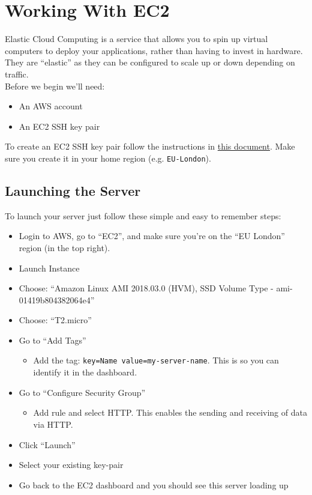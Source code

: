 \section{Working With EC2}

Elastic Cloud Computing is a service that allows you to spin up virtual computers to deploy your applications, rather than having to invest in hardware. They are ``elastic'' as they can be configured to scale up or down depending on traffic.
\\

Before we begin we'll need:

\begin{itemize}
    \item An AWS account
    \item An EC2 SSH key pair
\end{itemize}

To create an EC2 SSH key pair follow the instructions in \href{https://docs.aws.amazon.com/AWSEC2/latest/UserGuide/ec2-key-pairs.html#having-ec2-create-your-key-pair}{this document}. Make sure you create it in your home region (e.g. \texttt{EU-London}).

\subsection{Launching the Server}

To launch your server just follow these simple and easy to remember steps:

\begin{itemize}
    \item Login to AWS, go to ``EC2'', and make sure you're on the ``EU London'' region (in the top right).
    \item Launch Instance
    \item Choose: ``Amazon Linux AMI 2018.03.0 (HVM), SSD Volume Type - ami-01419b804382064e4''
    \item Choose: ``T2.micro''
    \item Go to ``Add Tags''
        \begin{itemize}
            \item Add the tag: \texttt{key=Name value=my-server-name}. This is so you can identify it in the dashboard.
        \end{itemize}
    \item Go to ``Configure Security Group''
        \begin{itemize}
            \item Add rule and select HTTP. This enables the sending and receiving of data via HTTP.
        \end{itemize}
    \item Click ``Launch''
    \item Select your existing key-pair
    \item Go back to the EC2 dashboard and you should see this server loading up
\end{itemize}

